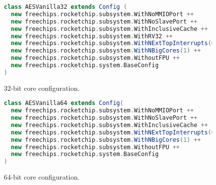 
\begin{figure}[!h]
\begin{lstlisting}[style={block},language={scala}]
class AESVanilla32 extends Config (
  new freechips.rocketchip.subsystem.WithNoMMIOPort ++
  new freechips.rocketchip.subsystem.WithNoSlavePort ++
  new freechips.rocketchip.subsystem.WithInclusiveCache ++
  new freechips.rocketchip.subsystem.WithRV32 ++
  new freechips.rocketchip.subsystem.WithNExtTopInterrupts(0) ++
  new freechips.rocketchip.subsystem.WithNBigCores(1) ++
  new freechips.rocketchip.subsystem.WithoutFPU ++
  new freechips.rocketchip.system.BaseConfig
)
\end{lstlisting}
\caption{$32$-bit  core configuration.}
\label{fig:rocket:32}
\end{figure}

\begin{figure}[!h]
\begin{lstlisting}[style={block},language={scala}]
class AESVanilla64 extends Config(
  new freechips.rocketchip.subsystem.WithNoMMIOPort ++
  new freechips.rocketchip.subsystem.WithNoSlavePort ++
  new freechips.rocketchip.subsystem.WithInclusiveCache ++
  new freechips.rocketchip.subsystem.WithNExtTopInterrupts(0) ++
  new freechips.rocketchip.subsystem.WithNBigCores(1) ++
  new freechips.rocketchip.subsystem.WithoutFPU ++
  new freechips.rocketchip.system.BaseConfig
)
\end{lstlisting}
\caption{$64$-bit  core configuration.}
\label{fig:rocket:64}
\end{figure}



